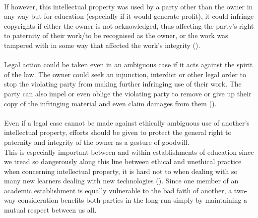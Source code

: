 \\If however, this intellectual property was used by a party other than the owner in any way but for education (especially if it would generate profit), it could infringe copyrights if either the owner is not acknowledged, thus affecting the party’s right to paternity of their work/to be recognised as the owner, or the work was tampered with in some way that affected the work’s integrity (\cite{LSEPIinComputerTech}).
\\\\Legal action could be taken even in an ambiguous case if it acts against the spirit of the law. The owner could seek an injunction, interdict or other legal order to stop the violating party from making further infringing use of their work. The party can also impel or even oblige the violating party to remove or give up their copy of the infringing material and even claim damages from them (\cite{JiscLegal-IntellectualProp.}).
\\\\Even if a legal case cannot be made against ethically ambiguous use of another's intellectual property, efforts should be given to protect the general right to paternity and integrity of the owner as a gesture of goodwill.
\\This is especially important between and within establishments of education since we tread so dangerously along this line between ethical and unethical practice when concerning intellectual property, it is hard not to when dealing with so many new learners dealing with new technologies (\cite{JiscLegal-IntellectualProp.}). Since one member of an academic establishment is equally vulnerable to the bad faith of another, a two-way consideration benefits both parties in the long-run simply by maintaining a mutual respect between us all.
